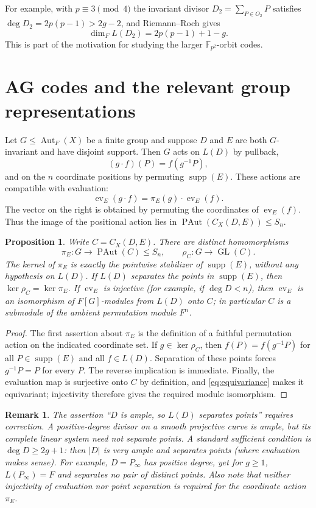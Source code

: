 \documentclass[12pt]{article}
\newtheorem{proposition}[theorem]{Proposition}
\newtheorem{remark}[theorem]{Remark}
\numberwithin{equation}{section}
\newcommand{\F}{\mathbb{F}}
\newcommand{\supp}{\operatorname{supp}}
\newcommand{\Aut}{\operatorname{Aut}}
\newcommand{\ev}{\operatorname{ev}}
\newcommand{\PAut}{\operatorname{PAut}}
\begin{document}
For example, with $p\equiv3\pmod4$ the invariant divisor
$D_2=\sum_{P\in O_2}P$ satisfies
$\deg D_2=2p(p-1)>2g-2$, and Riemann--Roch gives
\[
\dim_F L(D_2)=2p(p-1)+1-g.
\]
This is part of the motivation for studying the larger
$\F_{p^2}$-orbit codes.

\section{AG codes and the relevant group representations}
\label{sec:modules}
Let $G\leq\Aut_F(X)$ be a finite group and suppose $D$ and $E$
are both $G$-invariant and have disjoint support.  Then $G$ acts
on $L(D)$ by pullback,
\[
(g\cdot f)(P)=f(g^{-1}P),
\]
and on the $n$ coordinate positions by permuting $\supp(E)$.
These actions are compatible with evaluation:
\begin{equation}\label{eq:equivariance}
\ev_E(g\cdot f)=\pi_E(g)\cdot\ev_E(f).
\end{equation}
The vector on the right is obtained by permuting the coordinates
of $\ev_E(f)$.  Thus the image of the positional action lies in
$\PAut(C_X(D,E))\leq S_n$.

\begin{proposition}\label{prop:actions}
Write $C=C_X(D,E)$.  There are distinct homomorphisms
\[
\pi_E:G\longrightarrow\PAut(C)\leq S_n,
\qquad \rho_C:G\longrightarrow\operatorname{GL}(C).
\]
The kernel of $\pi_E$ is exactly the pointwise stabilizer of
$\supp(E)$, without any hypothesis on $L(D)$.
If $L(D)$ separates the points in $\supp(E)$, then
$\ker\rho_C=\ker\pi_E$.
If $\ev_E$ is injective (for example, if $\deg D<n$),
then $\ev_E$ is an isomorphism of $F[G]$-modules from
$L(D)$ onto $C$; in particular $C$ is a submodule of the
\emph{ambient permutation module} $F^n$.
\end{proposition}
\begin{proof}
The first assertion about $\pi_E$ is the definition of a
faithful permutation action on the indicated coordinate set.
If $g\in\ker\rho_C$, then $f(P)=f(g^{-1}P)$ for
all $P\in\supp(E)$ and all $f\in L(D)$.  Separation of
these points forces $g^{-1}P=P$ for every $P$.
The reverse implication is immediate.  Finally, the evaluation
map is surjective onto $C$ by definition, and
\eqref{eq:equivariance} makes it equivariant; injectivity
therefore gives the required module isomorphism.
\end{proof}

\begin{remark}\label{rem:separation}
The assertion ``$D$ is ample, so $L(D)$ separates points''
requires correction.  A positive-degree divisor on a smooth
projective curve is ample, but its complete linear system need
not separate points.  A standard sufficient condition is
$\deg D\geq2g+1$: then $|D|$ is very ample and separates
points (where evaluation makes sense).  For example,
$D=P_\infty$ has positive degree, yet for $g\geq1$,
$L(P_\infty)=F$ and separates no pair of distinct points.
Also note that neither injectivity of evaluation nor point
separation is required for the coordinate action $\pi_E$.
\end{remark}
\end{document}
